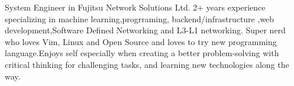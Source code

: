 

\begin{cvparagraph}

System Engineer in Fujitsu Network Solutions Ltd. 2+ years experience specializing in machine learning,progrraming, backend/infrastructure ,web development,Software Defined Networking and L3-L1 networking. Super nerd who loves Vim, Linux and Open Source and loves to try new programming language.Enjoys self especially when creating a better problem-solving with critical thinking for challenging tasks, and learning new technologies along the way.
\end{cvparagraph}
